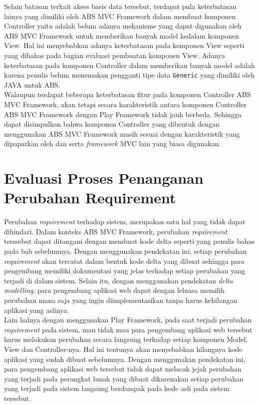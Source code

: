 Selain batasan terkait akses basis data tersebut, terdapat pula keterbatasan lainya yang dimiliki oleh ABS MVC Framework dalam membuat komponen Controller yaitu adalah belum adanya mekanisme yang dapat digunakan oleh ABS MVC Framework untuk memberikan banyak model kedalam komponen View. Hal ini menyebabkan adanya keterbatasan pada komponen View seperti yang dibahas pada bagian evaluasi pembuatan komponen View. Adanya keterbatasan pada komponen Controller dalam memberikan banyak model adalah karena penulis belum menemukan pengganti tipe data \texttt{Generic} yang dimiliki oleh JAVA untuk ABS.\\

Walaupun terdapat beberapa keterbatasan fitur pada komponen Controller ABS MVC Framework, akan tetapi secara karakteristik antara komponen Controller ABS MVC Framework dengan Play Framework tidak jauh berbeda. Sehingga dapat disimpulkan bahwa komponen Controller yang dibentuk dengan menggunakan ABS MVC Framework masih sesuai dengan karakteristik yang dipaparkan oleh \cite{krasner1988desc} dan \cite{leff2001web} serta \textit{framework} MVC lain yang biasa digunakan.

\section{Evaluasi Proses Penanganan Perubahan Requirement}

Perubahan \textit{requirement} terhadap sistem, merupakan satu hal yang tidak dapat dihindari. Dalam konteks ABS MVC Framework, perubahan \textit{requirement} terssebut dapat ditangani dengan membuat kode delta seperti yang penulis bahas pada bab sebelumnya. Dengan menggunakan pendekatan ini, setiap perubahan \textit{requirement} akan tercatat dalam bentuk kode delta yang dibuat sehingga para pengembang memiliki dokumentasi yang jelas terhadap setiap perubahan yang terjadi di dalam sistem. Selain itu, dengan menggunakan pendekatan \textit{delta modelling}, para pengembang aplikasi web dapat dengan leluasa memilih perubahan mana saja yang ingin diimplementasikan tanpa harus kehilangan aplikasi yang aslinya.\\

Lain halnya dengan menggunakan Play Framework, pada saat terjadi perubahan \textit{requirement} pada sistem, mau tidak mau para pengembang aplikasi web tersebut harus melakukan perubahan secara langsung terhadap setiap komponen Model, View dan Controller-nya. Hal ini tentunya akan menyebabkan hilangnya kode aplikasi yang sudah dibuat sebelumnya. Dengan menggunakan pendekatan ini, para pengembang aplikasi web tersebut tidak dapat melacak jejak perubahan yang terjadi pada perangkat lunak yang dibuat dikarenakan setiap perubahan yang terjadi pada sistem langsung berdampak pada kode asli pada sistem tersebut.\\

